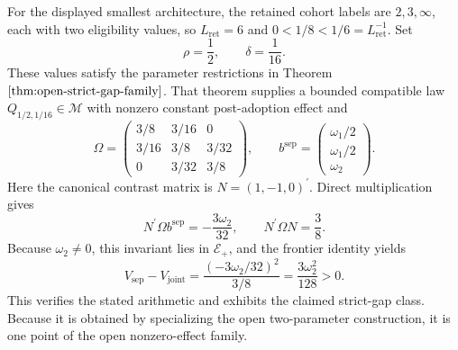 For the displayed smallest architecture, the retained cohort labels are \(2,3,\infty\), each with two eligibility values, so \(L_{\mathrm{ret}}=6\) and \(0<1/8<1/6=L_{\mathrm{ret}}^{-1}\). Set
\[
 \rho=\frac12,
 \qquad
 \delta=\frac1{16}.
\]
These values satisfy the parameter restrictions in Theorem \(\ref{thm:open-strict-gap-family}\). That theorem supplies a bounded compatible law \(Q_{1/2,1/16}\in\mathcal M\) with nonzero constant post-adoption effect and
\[
 \Omega=
 \begin{pmatrix}
 3/8&3/16&0\\
 3/16&3/8&3/32\\
 0&3/32&3/8
 \end{pmatrix},
 \qquad
 b^{\mathrm{sep}}=
 \begin{pmatrix}\omega_1/2\\ \omega_1/2\\ \omega_2\end{pmatrix}.
\]
Here the canonical contrast matrix is \(N=(1,-1,0)^{\prime}\). Direct multiplication gives
\[
 N^{\prime}\Omega b^{\mathrm{sep}}=-\frac{3\omega_2}{32},
 \qquad
 N^{\prime}\Omega N=\frac38.
\]
Because \(\omega_2\ne0\), this invariant lies in \(\mathscr E_+\), and the frontier identity yields
\[
 V_{\mathrm{sep}}-V_{\mathrm{joint}}
 =\frac{(-3\omega_2/32)^2}{3/8}
 =\frac{3\omega_2^2}{128}>0.
\]
This verifies the stated arithmetic and exhibits the claimed strict-gap class. Because it is obtained by specializing the open two-parameter construction, it is one point of the open nonzero-effect family.